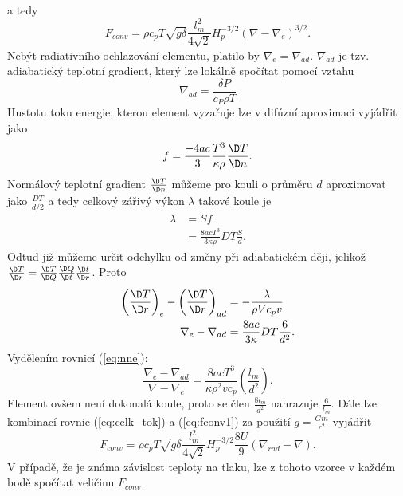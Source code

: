 a tedy
\begin{equation}
	F_{conv} = \rho c_p T\sqrt{g\delta}\frac{l^2_m}{4\sqrt{2}}H_p^{-3/2}(\nabla-\nabla _e)^{3/2}. \label{eq:fconv1}
\end{equation}
Nebýt radiativního ochlazování elementu, platilo by $\nabla_e=\nabla_{ad}$. $\nabla_{ad}$ je tzv. adiabatický teplotní gradient, který lze lokálně spočítat pomocí vztahu
\begin{equation}
	\nabla_{ad}=\frac{\delta P}{c_P\rho T}
\end{equation}
Hustotu toku energie, kterou element vyzařuje lze v difúzní aproximaci vyjádřit jako
\begin{equation}
	f = \frac{-4ac}{3}\frac{T^3}{\kappa\rho}\frac{\D T}{\D n}.
\end{equation}
Normálový teplotní gradient $\frac{\D T}{\D n}$ můžeme pro kouli o průměru $d$ aproximovat jako $\frac{DT}{d/2}$ a tedy celkový zářivý výkon $\lambda$ takové koule je
\begin{align}
	\lambda &= Sf\\
			&= \frac{8acT^3}{3\kappa\rho}DT\frac{S}{d}.
\end{align}
Odtud již můžeme určit odchylku od změny při adiabatickém ději, jelikož $\frac{\D T}{\D r} = \frac{\D T}{\D Q}\frac{\D Q}{\D t}\frac{\D t}{\D r}$. Proto
\begin{align}
	\left(\frac{\D T}{\D r}\right)_e-\left(\frac{\D T}{\D r}\right)_{ad} &= -\frac{\lambda}{\rho V c_p v}\\
	\nabla _e-\nabla _{ad} &= \frac{8ac}{3\kappa}DT\frac{6}{d^2}.
\end{align}
Vydělením rovnicí (\ref{eq:nne}):
\begin{equation}
	\frac{\nabla _e-\nabla _{ad}}{\nabla-\nabla _e} = \frac{8acT^3}{\kappa\rho^2vc_p}\left(\frac{l_m}{d^2}\right).
\end{equation}
Element ovšem není dokonalá koule, proto se člen $\frac{8l_m}{d^2}$ nahrazuje $\frac{6}{l_m}$. Dále lze kombinací rovnic (\ref{eq:celk_tok}) a (\ref{eq:fconv1}) za použití $g=\frac{Gm}{r^2}$ vyjádřit
\begin{equation}
	F_{conv} = \rho c_p T\sqrt{g\delta}\frac{l^2_m}{4\sqrt{2}}H_p^{-3/2}\frac{8U}{9}(\nabla_{rad}-\nabla). \label{eq:fconv}
\end{equation}
V případě, že je známa závislost teploty na tlaku, lze z tohoto vzorce v každém bodě spočítat veličinu $F_{conv}$.

